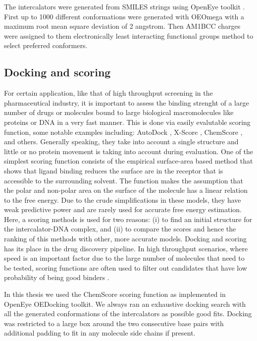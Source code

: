 The intercalators were generated from SMILES strings using OpenEye toolkit \cite{hawkins2010conformer}. First up to 1000 different conformations were generated with OEOmega with a maximum root mean square deviation of 2 angstrom. Then AM1BCC charges were assigned to them electronically least interacting functional groups method to select preferred conformers.

\subsection{Docking and scoring}

For certain application, like that of high throughput screening in the pharmaceutical industry, it is important to assess the binding strenght of a large number of drugs or molecules bound to large biological macromolecules like proteins or DNA in a very fast manner. This is done via easily evalutable scoring function, some notable examples including: AutoDock \cite{trott2010autodock}, X-Score \cite{wang2002further}, ChemScore \cite{eldridge1997empirical}, and others. Generally speaking, they take into account a single structure and little or no protein movement is taking into account during evaluation. One of the simplest scoring function  consists of the empirical surface-area based method that shows that ligand binding reduces the surface are in the receptor that is accessible to the surrounding solvent. The function makes the assumption that the polar and non-polar area on the surface of the molecule has a linear relation to the free energy. Due to the crude simplifications in these models, they have weak predictive power and are rarely used for accurate free energy estimation. Here, a scoring methods is used for two reasons: (i) to find an initial structure for the intercalator-DNA complex, and (ii) to compare the scores and hence the ranking of this methods with other, more accurate models. Docking and scoring has its place in the drug discovery pipeline. In high throughput scenarios, where speed is an important factor due to the large number of molecules that need to be tested, scoring functions are often used to filter out candidates that have low probability of being good binders \cite{mobley2009binding}.

In this thesis we used the ChemScore scoring function as implemented in OpenEye OEDocking toolkit. We always ran an exhaustive docking search with all the generated conformations of the intercalators as possible good fits. Docking was restricted to a large box around the two consecutive base pairs with additional padding to fit in any molecule side chains if present. 





% 
